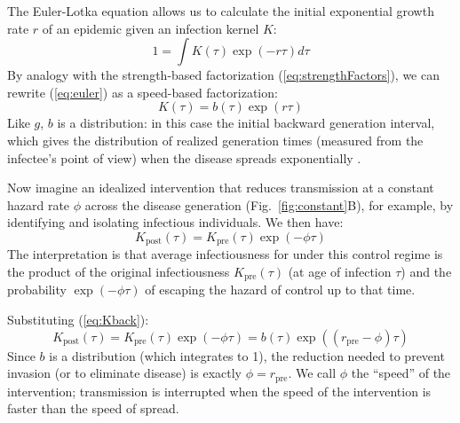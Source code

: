 \documentclass[12pt]{article}
\newcommand{\KK}{\ensuremath{{K}}}
\newcommand{\Kx}[1]{\ensuremath{\KK_{\mathrm{#1}}}}
\newcommand{\Kpre}{\Kx{pre}}
\newcommand{\Kpost}{\Kx{post}}
\newcommand{\rr}{\ensuremath{{r}}}
\newcommand{\rx}[1]{\ensuremath{\rr_{\mathrm{#1}}}}
\newcommand{\rpre}{\rx{pre}}
\newcommand{\figref}[1]{Fig.~\ref{fig:#1}}
\renewcommand{\eqref}[1]{(\ref{eq:#1})}
\newcommand{\eqlab}[1]{\label{eq:#1}}
\begin{document}
The Euler-Lotka equation allows us to calculate the initial exponential growth rate $r$ of an epidemic given an infection kernel $K$:
\begin{equation}
	1 = \int K(\tau) \exp(-r\tau) d\tau
	\eqlab{euler}
\end{equation}
By analogy with the strength-based factorization \eqref{strengthFactors}, we can rewrite \eqref{euler} as a speed-based factorization:
\begin{equation}
K(\tau) = b(\tau)\exp(r\tau)
\eqlab{Kback}
\end{equation}
Like $g$, $b$ is a distribution: in this case the initial backward generation interval, which gives the distribution of realized generation times (measured from the infectee's point of view) when the disease spreads exponentially \citep{champredon2015intrinsic, britton2019estimation}.

Now imagine an idealized intervention that reduces transmission at a constant hazard rate $\phi$ across the disease generation (\figref{constant}B), for example, by identifying and isolating infectious individuals.
We then have:
\begin{equation}
	\Kpost(\tau) = \Kpre(\tau)\exp(-\phi\tau)
\end{equation}
The interpretation is that average infectiousness for under this control regime is the product of the original infectiousness $\Kpre(\tau)$ (at age of infection $\tau$) and the probability $\exp(-\phi\tau)$ of escaping the hazard of control up to that time.

Substituting \eqref{Kback}:
\begin{equation}
	\Kpost(\tau) = \Kpre(\tau)\exp(-\phi\tau) = b(\tau)\exp((\rpre-\phi)\tau)
\end{equation}
Since $b$ is a distribution (which integrates to 1), the reduction needed to prevent invasion (or to eliminate disease) is exactly $\phi=\rpre$. 
We call $\phi$ the ``speed'' of the intervention; transmission is interrupted when the speed of the intervention is faster than the speed of spread.
\end{document}
